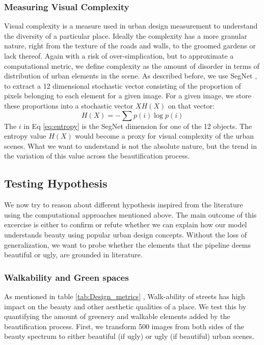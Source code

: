 \subsubsection{Measuring Visual Complexity}
Visual complexity is a measure used in urban design measurement \cite{ewing2013measuring} to understand the diversity of a particular place. Ideally the complexity has a more granular nature, right from the texture of the roads and walls, to the groomed gardens or lack thereof. Again with a risk of over-simplication, but to approximate a computational metric, we define complexity as the amount of disorder in terms of distribution of urban elements in the scene. As described before, we use SegNet \cite{badrinarayanan2015segnet} , to extract a 12 dimensional stochastic vector consisting of the proportion of pixels belonging to each element for a given image.
For a given image, we store these proportions into a stochastic vector $XH(X)$ on that vector:
\begin{equation}
H(X) = -\sum p(i)\log p(i)
\label{eq:entropy} 
\end{equation}
The $i$ in Eq \ref{eq:entropy} is the SegNet dimension for one of the 12 objects. The entropy value $H(X)$ would become a proxy for visual complexity of the urban scenes. What we want to understand is not the absolute nature, but the trend in the variation of this value across the beautification process. 


\subsection{Testing Hypothesis}
We now try to reason about different hypothesis inspired from the literature \cite{ewing2013measuring,urbanDesign,alexander1977pattern} using the computational approaches mentioned above. The main outcome of this excercise is either to confirm or refute whether we can explain how our model understands beauty using popular urban design concepts. Without the loss of generalization, we want to probe whether the elements that the pipeline deems beautiful or ugly, are grounded in literature. 

\subsubsection{Walkability and Green spaces}
As mentioned in table \ref{tab:Design_metrics} , Walk-ability of streets has high impact on the beauty and other aesthetic qualities of a place. We test this by quantifying the amount of greenery and walkable elements added by the beautification process.
First, we transform 500 images from both sides of the beauty spectrum to either beautiful (if ugly) or ugly (if beautiful) urban scenes. %

